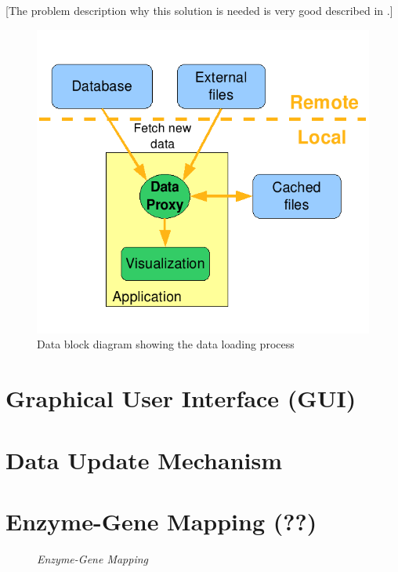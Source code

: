 [The problem description why this solution is needed is very good described in \citep{Bourqui2006}.]

\begin{figure}[ht]
  \centering
    \includegraphics[width=0.5\linewidth]{gfx/data_block_diagram_new}
  \caption{Data block diagram showing the data loading process}
  \label{fig:data_block_diagram}
\end{figure}



\section{Graphical User Interface (GUI)}

\section{Data Update Mechanism}


\section{Enzyme-Gene Mapping (??)}

\begin{figure}[ht]
\centering
{} 
\caption[Enzyme-Gene Mapping]{\textit{Enzyme-Gene Mapping}} 
\label{gfx:enzyme_gene_mapping}
\end{figure}

